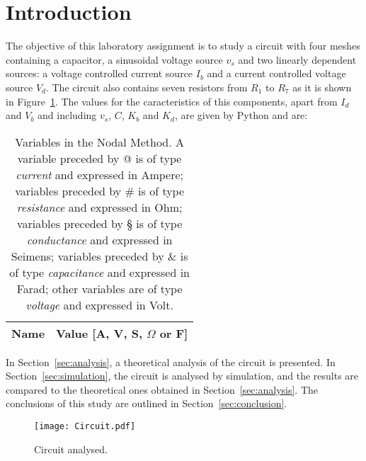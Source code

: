 \section{Introduction}
\label{sec:introduction}

The objective of this laboratory assignment is to study a circuit with four meshes containing a capacitor, a sinusoidal voltage source $v_s$ and two linearly dependent sources: a voltage controlled current source $I_b$ and a current controlled voltage source $V_d$. The circuit also contains seven resistors from $R_1$ to $R_7$ as it is shown in Figure~\ref{fig:Circuit_Base}.
The values for the caracteristics of this components, apart from $I_d$ and $V_b$ and including $v_s$, $C$, $K_b$ and $K_d$, are given by Python and are:

\begin{table}[h]
  \centering
 \begin{tabular}{|l|r|}
    \hline    
    {\bf Name} & {\bf Value [A, V, S, $\Omega$ or F]} \\ \hline
    
  \end{tabular}
  \caption{Variables in the Nodal Method. A variable preceded by @ is of type {\em current} and expressed in Ampere; variables preceded by \# is of type {\em resistance} and expressed in Ohm; variables preceded by § is of type {\em conductance} and expressed in Seimens; variables preceded by \& is of type {\em capacitance} and expressed in Farad; other variables are of type {\em voltage} and expressed in Volt.}
  \label{tab:Enunciado}
\end{table}

In Section~\ref{sec:analysis}, a theoretical analysis of the circuit is
presented. In Section~\ref{sec:simulation}, the circuit is analysed by
simulation, and the results are compared to the theoretical ones obtained in
Section~\ref{sec:analysis}. The conclusions of this study are outlined in
Section~\ref{sec:conclusion}.

\begin{figure}[h] \centering
\texttt{[image: Circuit.pdf]}
\caption{Circuit analysed.}
\label{fig:Circuit_Base}
\end{figure}